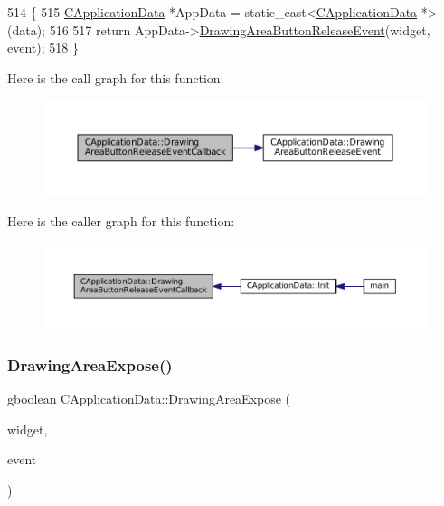 \begin{DoxyCode}
514                                                                                                            
                  \{
515     \hyperlink{classCApplicationData}{CApplicationData} *AppData = \textcolor{keyword}{static\_cast<}\hyperlink{classCApplicationData}{CApplicationData} *\textcolor{keyword}{>}(data);
516 
517     \textcolor{keywordflow}{return} AppData->\hyperlink{classCApplicationData_a7df4d71ef6fabf7eac740c95cfe3cd81}{DrawingAreaButtonReleaseEvent}(widget, event);
518 \}
\end{DoxyCode}
Here is the call graph for this function\+:
\nopagebreak
\begin{figure}[H]
\begin{center}
\leavevmode
\includegraphics[width=350pt]{classCApplicationData_a2708d2083c8c2e7c8de126b40eb17b3f_cgraph}
\end{center}
\end{figure}
Here is the caller graph for this function\+:
\nopagebreak
\begin{figure}[H]
\begin{center}
\leavevmode
\includegraphics[width=350pt]{classCApplicationData_a2708d2083c8c2e7c8de126b40eb17b3f_icgraph}
\end{center}
\end{figure}
\hypertarget{classCApplicationData_ae998e896194920e08f69f321f3bc9500}{}\label{classCApplicationData_ae998e896194920e08f69f321f3bc9500} 
\subsubsection{\texorpdfstring{Drawing\+Area\+Expose()}{DrawingAreaExpose()}}
{\footnotesize\ttfamily gboolean C\+Application\+Data\+::\+Drawing\+Area\+Expose (\begin{DoxyParamCaption}\item[{Gtk\+Widget $\ast$}]{widget,  }\item[{Gdk\+Event\+Expose $\ast$}]{event }\end{DoxyParamCaption})\hspace{0.3cm}{\ttfamily [protected]}}



